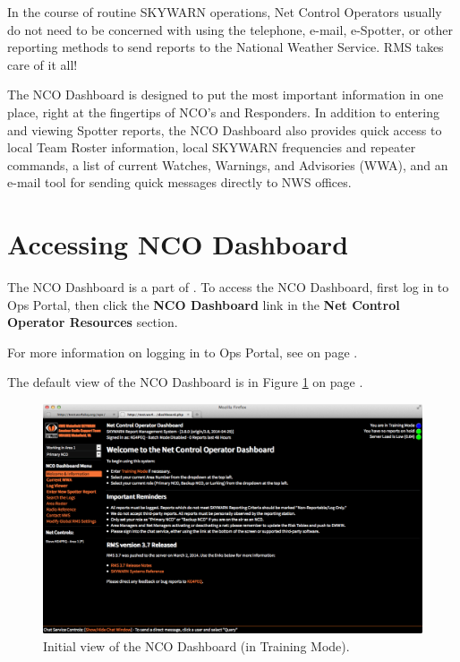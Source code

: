 \documentclass[pdflatex,letterpaper,twoside,12pt]{book}
\begin{document}
In the course of routine SKYWARN operations, Net Control Operators usually do not need to be concerned with using the telephone, e-mail, e-Spotter, or other reporting methods to send reports to the National Weather Service.  RMS takes care of it all!


The NCO Dashboard is designed to put the most important information in one place, right at the fingertips of NCO's and Responders.  In addition to entering and viewing Spotter reports, the NCO Dashboard also provides quick access to local Team Roster information, local SKYWARN frequencies and repeater commands, a list of current Watches, Warnings, and Advisories (WWA), and an e-mail tool for sending quick messages directly to NWS offices.


\section{Accessing NCO Dashboard}

The NCO Dashboard is a part of .  To access the NCO Dashboard, first log in to Ops Portal, then click the \textbf{NCO Dashboard} link in the \textbf{Net Control Operator Resources} section.

For more information on logging in to Ops Portal, see  on page \pageref{accessing-ops-portal}.

The default view of the NCO Dashboard is in Figure \ref{fig:dash-main-screen} on page \pageref{fig:dash-main-screen}.

\begin{figure}[h]
  \centering
  \includegraphics[width=\textwidth,keepaspectratio=true]{img/dash-main-screen}
  \caption{Initial view of the NCO Dashboard (in Training Mode).\label{fig:dash-main-screen}}
\end{figure}
\end{document}
